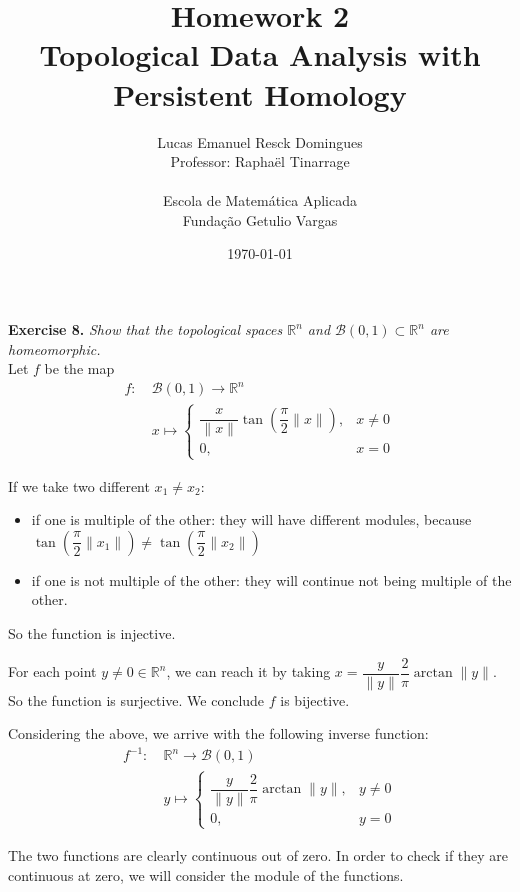 \documentclass{article}
\title{Homework 2\\
    \large{Topological Data Analysis with Persistent Homology}}
\author{Lucas Emanuel Resck Domingues\\    
    Professor: Raphaël Tinarrage\\\\
    {Escola de Matemática Aplicada}\\
    {Fundação Getulio Vargas}}
\date{\today}
\begin{document}
    \maketitle

    \noindent\textbf{Exercise 8.} \textit{Show that the topological spaces $\mathbb{R}^n$ and $\mathcal{B}(0, 1) \subset \mathbb{R}^n$ are homeomorphic.}\\

    Let $f$ be the map
    \begin{align*}
        f: \ &\mathcal{B}(0, 1) \to \mathbb{R}^n\\
        &x \mapsto \begin{cases}
            \dfrac{x}{\lVert x \lVert} \tan\left(\dfrac{\pi}{2}\lVert x \lVert \right), &x \ne 0\\
            0, &x = 0
        \end{cases}
    \end{align*}

    If we take two different $x_1 \ne x_2$:
    \begin{itemize}
        \item if one is multiple of the other: they will have different modules, because $\tan\left(\dfrac{\pi}{2}\lVert x_1 \lVert \right) \ne \tan\left(\dfrac{\pi}{2}\lVert x_2 \lVert \right)$
        \item if one is not multiple of the other: they will continue not being multiple of the other.
    \end{itemize}
    So the function is injective.

    For each point $y \ne 0 \in \mathbb{R}^n$, we can reach it by taking $x = \dfrac{y}{\lVert y \lVert} \dfrac{2}{\pi}\arctan\lVert y \lVert$.
    So the function is surjective. We conclude $f$ is bijective.

    Considering the above, we arrive with the following inverse function:
    \begin{align*}
        f^{-1}: \ &\mathbb{R}^n \to \mathcal{B}(0, 1)\\
        &y \mapsto \begin{cases}
            \dfrac{y}{\lVert y \lVert} \dfrac{2}{\pi}\arctan\lVert y \lVert, &y \ne 0\\
            0, &y = 0
        \end{cases}
    \end{align*}

    The two functions are clearly continuous out of zero. In order to check if they are continuous at zero, we will consider the module of the functions.
    
\end{document}
